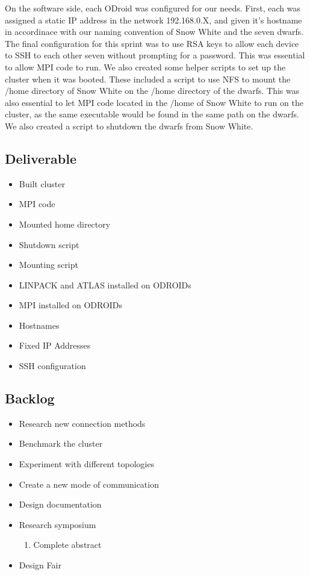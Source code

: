 On the software side, each ODroid was configured for our needs. First, each was assigned a static IP address in the network 192.168.0.X, and given it's hostname in accordinace with our naming convention of Snow White and the seven dwarfs. The final configuration for this sprint was to use RSA keys to allow each device to SSH to each other seven without prompting for a password. This was essential to allow MPI code to run. We also created some helper scripts to set up the cluster when it was booted. These included a script to use NFS to mount the /home directory of Snow White on the /home directory of the dwarfs. This was also essential to let MPI code located in the /home of Snow White to run on the cluster, as the same executable would be found in the same path on the dwarfs. We also created a script to shutdown the dwarfs from Snow White. 

\subsection{Deliverable}

\begin{itemize}
\item Built cluster
\item MPI code
\item Mounted home directory
\item Shutdown script
\item Mounting script
\item LINPACK and ATLAS installed on ODROIDs
\item MPI installed on ODROIDs
\item Hostnames
\item Fixed IP Addresses
\item SSH configuration
\end{itemize}

\subsection{Backlog}

\begin{itemize}
\item Research new connection methods
\item Benchmark the cluster
\item Experiment with different topologies
\item Create a new mode of communication
\item Design documentation
\item Research symposium
\begin{enumerate}
\item Complete abstract
\end{enumerate}
\item Design Fair
\end{itemize}

